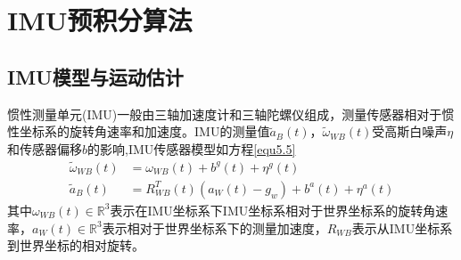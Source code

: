 \section{IMU预积分算法}

\subsection{IMU模型与运动估计}
惯性测量单元(IMU)一般由三轴加速度计和三轴陀螺仪组成，测量传感器相对于惯性坐标系的旋转角速率和加速度。IMU的测量值$\widetilde{a}_B(t)$，$\widetilde{\omega}_{W\!B}(t)$受高斯白噪声$\eta$和传感器偏移$b$的影响,IMU传感器模型如方程\ref{equ5.5}
\begin{equation}
\label{equ5.5}
\begin{aligned}
\widetilde{\omega}_{W\!B}(t) &= \omega_{W\!B}(t)+b^g(t)+\eta^g(t) \\
\widetilde{a}_B(t) &= R_{W\!B}^T(t)(a_W(t)-g_w)+b^a(t)+\eta^a(t)
\end{aligned}
\end{equation}
其中$\omega_{W\!B}(t) \in \mathds{R}^3$表示在IMU坐标系下IMU坐标系相对于世界坐标系的旋转角速率，$a_W(t) \in \mathds{R}^3$表示相对于世界坐标系下的测量加速度，$R_{W\!B}$表示从IMU坐标系到世界坐标的相对旋转。

